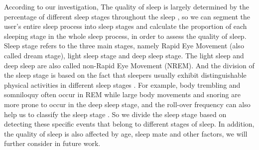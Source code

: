 According to our investigation, The quality of sleep is largely determined by the percentage of different sleep stages throughout the sleep \cite{iSleep,gu2016sleep}, so we can segment the user's entire sleep process into sleep stages and calculate the proportion of each sleeping stage in the whole sleep process, in order to assess the quality of sleep.  Sleep stage refers to the three main stages, namely Rapid Eye Movement (also called dream stage), light sleep stage and deep sleep stage. The light sleep and deep sleep are also called non-Rapid Eye Movement (NREM). And the division of the sleep stage is based on the fact that sleepers usually exhibit distinguishable physical activities in different sleep stages \cite{ancoli2003role}. For example, body trembling and somniloquy often occur in REM while large body movements and snoring are more prone to occur in the deep sleep stage, and the roll-over frequency can also help us to classify the sleep stage \cite{rollover2007}. So we divide the sleep stage based on detecting these specific events  that belong to different stages of sleep. In addition, the quality of sleep is also affected by age, sleep mate and other factors, we will further consider in future work.


